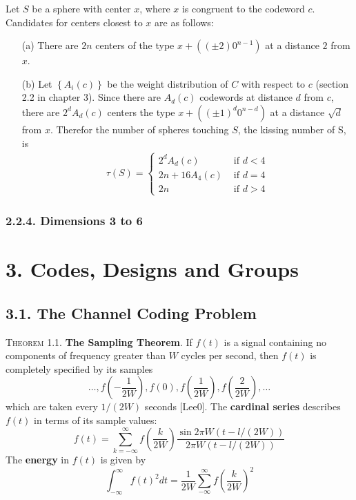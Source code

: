 \documentclass{article}
\renewcommand{\tt}[1]{\text{ #1 }}
\renewcommand{\=}{\equiv}
\newcommand{\ass}[1]{\left( #1 \right)}
\newcommand{\set}[1]{\left\{ #1 \right\}}
\newcommand{\header}[1]{\vspace{1em}\noindent\textsc{#1.} }
\begin{document}
Let $S$ be a sphere with center $x$, where $x$ is congruent to the codeword $c$.
Candidates for centers closest to $x$ are as follows:
\begin{enumerate}
  \item[(a)]
  There are $2n$ centers of the type $x + ((\pm 2) 0^{n-1})$ at a distance $2$ from $x$.

  \item[(b)]
  Let $\set{A_i(c)}$ be the weight distribution of $C$ with respect to $c$ (section 2.2 in chapter 3).
  Since there are $A_d(c)$ codewords at distance $d$ from $c$, there are $2^d A_d(c)$ centers the type $x + ((\pm 1)^d 0^{n-d})$ at a distance $\sqrt d$ from $x$.
  Therefor the number of spheres touching $S$, the kissing number of S, is
  \begin{align*}
    \tau(S) = \begin{cases}
      2^d A_d(c)     &\tt{if} d < 4 \\
      2n + 16 A_4(c) &\tt{if} d = 4 \\
      2n             &\tt{if} d > 4
    \end{cases}
  \end{align*}
\end{enumerate}

\subsubsection*{2.2.4. Dimensions 3 to 6}



\section*{3. Codes, Designs and Groups}

\subsection*{3.1. The Channel Coding Problem}

\header{Theorem 1.1}
\textbf{The Sampling Theorem}.
If $f(t)$ is a signal containing no components of frequency greater than $W$ cycles per second, then $f(t)$ is completely specified by its samples
$$ \dots, f \ass{-\frac{1}{2W}}, f(0), f\ass{\frac{1}{2W}}, f\ass{\frac{2}{2W}}, \dots $$
which are taken every $1/(2W)$ seconds [Lee0].
The \textbf{cardinal series} describes $f(t)$ in terms of its sample values:
$$ f(t) = \sum_{k = -\infty}^\infty f\ass{\frac{k}{2W}} \frac{\sin 2\pi W (t - l/(2W))}{2\pi W (t- l/(2W))} $$
The \textbf{energy} in $f(t)$ is given by
$$ \int_{-\infty}^\infty f(t)^2 dt = \frac{1}{2W} \sum_{-\infty}^\infty f\ass{\frac{k}{2W}}^2 $$
\end{document}
